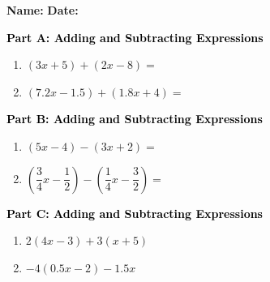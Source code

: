 \documentclass[12pt, letterpaper, fleqn]{article}
\begin{document}
\textbf{Name:} \underline{\hspace{5cm}}
\hfill
\textbf{Date:} \underline{\hspace{3cm}}\\

\begin{tcolorbox}[colback=customteal!20]
\large\textcolor{black}{\textbf{Part A: Adding and Subtracting Expressions}}
\end{tcolorbox}

\vspace{3mm}

\begin{enumerate}[itemsep=2.5cm, leftmargin=0.6cm]
\item $(3x + 5) + (2x - 8) =$
\item $(7.2x - 1.5) + (1.8x + 4) =$
\end{enumerate}

\newpage

\begin{tcolorbox}[colback=customteal!20]
\large\textcolor{black}{\textbf{Part B: Adding and Subtracting Expressions}}
\end{tcolorbox}

\vspace{3mm}

\begin{enumerate}[itemsep=2.5cm, leftmargin=0.6cm, resume]
\item $(5x - 4) - (3x + 2) =$
\item $\left(\dfrac{3}{4}x - \dfrac{1}{2}\right) - \left(\dfrac{1}{4}x - \dfrac{3}{2}\right) =$
\end{enumerate}

\newpage

\begin{tcolorbox}[colback=customteal!20]
\large\textcolor{black}{\textbf{Part C: Adding and Subtracting Expressions}}
\end{tcolorbox}

\vspace{3mm}

\begin{enumerate}[itemsep=2.5cm, leftmargin=0.6cm, resume]
\item $2(4x - 3) + 3(x + 5)$
\item $-4(0.5x - 2) - 1.5x$
\end{enumerate}
\end{document}
